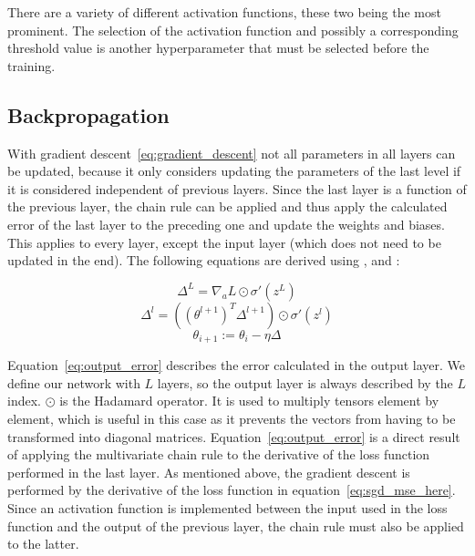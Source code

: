 There are a variety of different activation functions, these two being the most prominent.
The selection of the activation function and possibly a corresponding threshold value is another hyperparameter that must be selected before the training.

\subsection{Backpropagation}

With gradient descent~\eqref{eq:gradient_descent} not all parameters in all layers can be updated, because it only considers updating the parameters of the last level if it is considered independent of previous layers.
Since the last layer is a function of the previous layer, the chain rule can be applied and thus apply the calculated error of the last layer to the preceding one and update the weights and biases. This applies to every layer, except the input layer (which does not need to be updated in the end).
The following equations are derived using \cite[p.733]{StuartRussell2018}, \cite[p.197]{Goodfellow2017} and \cite[ch.2]{Nielsen2015}:

\begin{equation}
    \varDelta^L = \nabla_a L \odot \sigma'(z^L)
    \label{eq:output_error}
\end{equation}
\begin{equation}
    \varDelta^l = ((\theta^{l+1})^T \varDelta^{l+1}) \odot \sigma'(z^l)
    \label{eq:hidden_error}
\end{equation}
\begin{equation}
    \theta_{i+1} := \theta_i - \eta \varDelta
    \label{eq:backprop_update}
\end{equation}

Equation~\eqref{eq:output_error} describes the error calculated in the output layer. We define our network with $L$ layers, so the output layer is always described by the $L$ index.
$\odot$ is the Hadamard operator. It is used to multiply tensors element by element, which is useful in this case as it prevents the vectors from having to be transformed into diagonal matrices.
Equation~\eqref{eq:output_error} is a direct result of applying the multivariate chain rule to the derivative of the loss function performed in the last layer.
As mentioned above, the gradient descent is performed by the derivative of the loss function in equation~\eqref{eq:sgd_mse_here}.
Since an activation function is implemented between the input used in the loss function and the output of the previous layer, the chain rule must also be applied to the latter.

